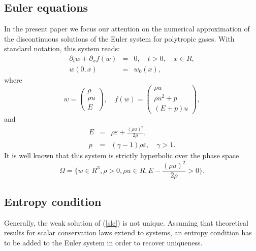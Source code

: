 \documentclass{fldauth}
\theoremstyle{plain}
\theoremstyle{plain}
\theoremstyle{plain}
\theoremstyle{plain}
\theoremstyle{plain}
\theoremstyle{plain}
\begin{document}
\subsection{Euler equations}

In the present paper we focus our attention on the numerical approximation of
the discontinuous solutions of the Euler system for polytropic gases. With standard
notation, this system reads:
\begin{eqnarray}
\partial _{t}w+\partial _{x}f(w) & = & 0,\quad t>0,\quad x\in R,\label{slc} \\
w(0,x) & = & w_{0}(x),\nonumber
\end{eqnarray}
 where
\[
w=\left( \begin{array}{c}
\rho \\
\rho u\\
E
\end{array}\right) ,\quad f(w)=\left( \begin{array}{c}
\rho u\\
\rho u^{2}+p\\
(E+p)u
\end{array}\right) ,\]
and
\begin{eqnarray*}
E & = & \rho \varepsilon +\frac{(\rho u)^{2}}{2\rho },\\
p & = & (\gamma -1)\rho \varepsilon ,\quad \gamma >1.
\end{eqnarray*}
It is well known that this system is strictly hyperbolic over the phase space
\[
\Omega =\{w\in R^{3},\rho >0,\rho u\in R,E-\frac{(\rho u)^{2}}{2\rho }>0\}.\]



\subsection{Entropy condition}

Generally, the weak solution of (\ref{slc}) is not unique. Assuming that theoretical
results for scalar conservation laws extend to systems, an entropy condition
has to be added to the Euler system in order to recover uniqueness.
\end{document}
